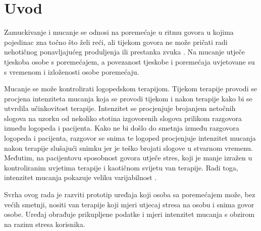 \chapter{Uvod}
\label{pog:uvod}

Zamuckivanje i mucanje se odnosi na poremećaje u ritmu govora u kojima pojedinac zna točno što želi reći, ali tijekom govora ne može pričati radi nehotičnog ponavljajućeg produljenja ili prestanka zvuka \cite{who}. Na mucanje utječe tjeskoba osobe s poremećajem, a povezanost tjeskobe i poremećaja uvjetovane su s vremenom i izloženosti osobe poremećaju.

Mucanje se može kontrolirati logopedskom terapijom. Tijekom terapije provodi se procjena intenziteta mucanja koja se provodi tijekom i nakon terapije kako bi se utvrdila učinkovitost terapije. Intenzitet se procjenjuje brojanjem netočnih slogova na uzorku od nekoliko stotina izgovorenih slogova prilikom razgovora između logopeda i pacijenta. Kako ne bi došlo do smetnja između razgovora logopeda i pacijenta, razgovor se snima te logoped procjenjuje intenzitet mucanja nakon terapije slušajući snimku jer je teško brojati slogove u stvarnom vremenu. Međutim, na pacijentovu sposobnost govora utječe stres, koji je manje izražen u kontroliranim uvjetima terapije i kaotičnom svijetu van terapije. Radi toga, intenzitet mucanja pokazuje veliku varijabilnost \cite{TICHENOR2015}.

Svrha ovog rada je razviti prototip uređaja koji osoba sa poremećajem može, bez većih smetnji, nositi van terapije koji mjeri utjecaj stresa na osobu i snima govor osobe. Uređaj obrađuje prikupljene podatke i mjeri intenzitet mucanja s obzirom na razinu stresa korisnika.